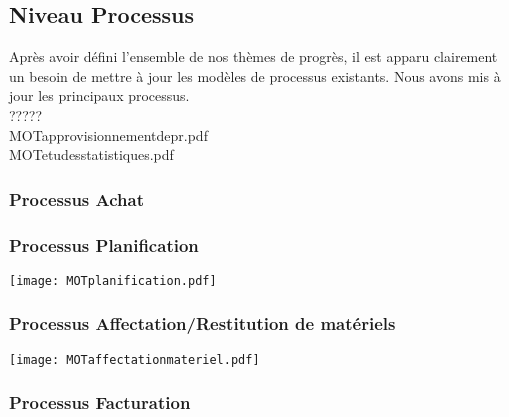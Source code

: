         \subsection{Niveau Processus}
        Après avoir défini l'ensemble de nos thèmes de progrès, il est apparu clairement un besoin de mettre à jour les modèles de processus existants. Nous avons mis à jour les principaux processus.\\

                    ?????\\
                    MOTapprovisionnementdepr.pdf\\
                    MOTetudesstatistiques.pdf\\


                \subsubsection{Processus Achat}


                \subsubsection{Processus Planification}
                    
                    \texttt{[image: MOTplanification.pdf]}
                
                \subsubsection{Processus Affectation/Restitution de matériels}

                    \texttt{[image: MOTaffectationmateriel.pdf]}

                \subsubsection{Processus Facturation}


